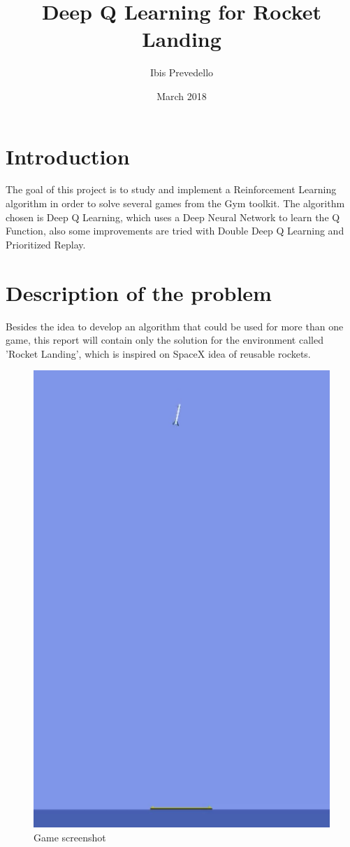 \documentclass{article}
\title{Deep Q Learning for Rocket Landing}
\date{March 2018}
\author{Ibis Prevedello}
\begin{document}
\maketitle

\section{Introduction}
The goal of this project is to study and implement a Reinforcement Learning algorithm in order to solve several games from the Gym toolkit. The algorithm chosen is Deep Q Learning, which uses a Deep Neural Network to learn the Q Function, also some improvements are tried with Double Deep Q Learning and Prioritized Replay.

\section{Description of the problem}
Besides the idea to develop an algorithm that could be used for more than one game, this report will contain only the solution for the environment called 'Rocket Landing', which is inspired on SpaceX idea of reusable rockets.

\begin{figure}[h]
\centering
\includegraphics[scale=0.30]{environment}
\caption{Game screenshot}
\label{fig:fig1}
\end{figure}
\end{document}
